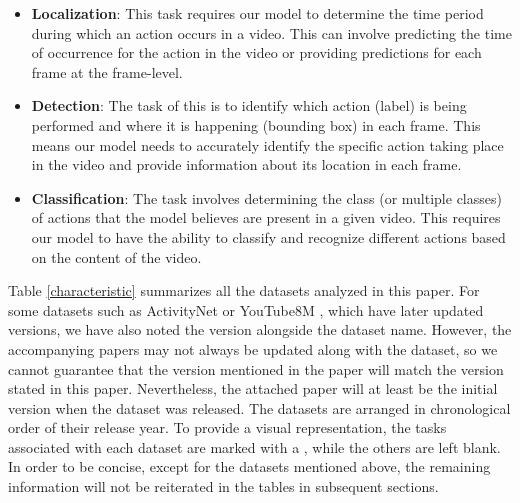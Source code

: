 \documentclass[a4paper]{article}
\begin{document}
\begin{itemize}
	\item \textbf{Localization}: This task requires our model to determine the time period during which an action occurs in a video. This can involve predicting the time of occurrence for the action in the video or providing predictions for each frame at the frame-level.

	\item \textbf{Detection}: The task of this is to identify which action (label) is being performed and where it is happening (bounding box) in each frame. This means our model needs to accurately identify the specific action taking place in the video and provide information about its location in each frame.

	\item \textbf{Classification}: The task involves determining the class (or multiple classes) of actions that the model believes are present in a given video. This requires our model to have the ability to classify and recognize different actions based on the content of the video.
\end{itemize}

\newcommand{\cmark}{\ding{51}}%
\newcommand{\xmark}{\ding{55}}%

Table \ref{characteristic} summarizes all the datasets analyzed in this paper. For some datasets such as ActivityNet \cite{ActivityNet} or YouTube8M \cite{YouTube8M}, which have later updated versions, we have also noted the version alongside the dataset name. However, the accompanying papers may not always be updated along with the dataset, so we cannot guarantee that the version mentioned in the paper will match the version stated in this paper. Nevertheless, the attached paper will at least be the initial version when the dataset was released. The datasets are arranged in chronological order of their release year. To provide a visual representation, the tasks associated with each dataset are marked with a \cmark, while the others are left blank. In order to be concise, except for the datasets mentioned above, the remaining information will not be reiterated in the tables in subsequent sections.
\end{document}
